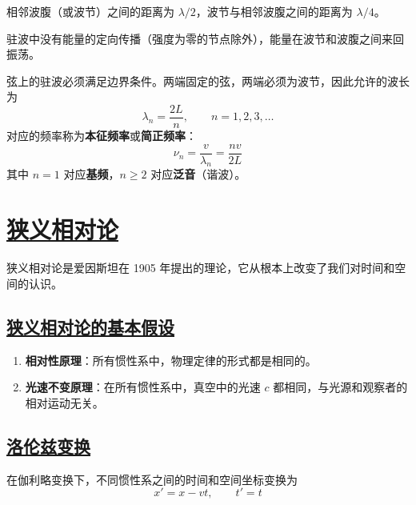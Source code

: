 相邻波腹（或波节）之间的距离为 $\lambda/2$，波节与相邻波腹之间的距离为 $\lambda/4$。

驻波中没有能量的定向传播（强度为零的节点除外），能量在波节和波腹之间来回振荡。

\begin{remark}
    弦上的驻波必须满足边界条件。两端固定的弦，两端必须为波节，因此允许的波长为
    \begin{equation}
        \lambda_n = \frac{2L}{n}, \qquad n = 1, 2, 3, \ldots
    \end{equation}
    对应的频率称为\textbf{本征频率}或\textbf{简正频率}：
    \begin{equation}
        \nu_n = \frac{v}{\lambda_n} = \frac{nv}{2L}
    \end{equation}
    其中 $n=1$ 对应\textbf{基频}，$n \geq 2$ 对应\textbf{泛音}（谐波）。
\end{remark}


\newpage
\section{\protect\hyperlink{:}{狭义相对论}}

狭义相对论是爱因斯坦在 1905 年提出的理论，它从根本上改变了我们对时间和空间的认识。

\subsection{\protect\hyperlink{:}{狭义相对论的基本假设}}

\begin{theorem}[狭义相对论的两个基本假设]
    \begin{enumerate}
        \item \textbf{相对性原理}：所有惯性系中，物理定律的形式都是相同的。
        \item \textbf{光速不变原理}：在所有惯性系中，真空中的光速 $c$ 都相同，与光源和观察者的相对运动无关。
    \end{enumerate}
\end{theorem}

\subsection{\protect\hyperlink{:}{洛伦兹变换}}

在伽利略变换下，不同惯性系之间的时间和空间坐标变换为
\begin{equation}
    x' = x - vt, \qquad t' = t
\end{equation}

